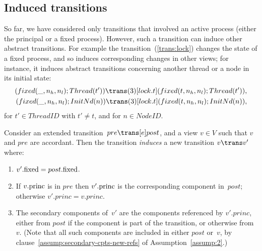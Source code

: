
\subsection{Induced transitions}

So far, we have considered only transitions that involved an active process
(either the principal or a fixed process). However, such a transition can
induce other abstract transitions.  For example the
transition~(\ref{trans:lock}) changes the state of a fixed process, and so
induces corresponding changes in other views; for instance, it induces abstract
transitions concerning another thread or a node in its initial state:
%
\[
\begin{align}
(fixed(\_, n_h, n_l); Thread(t'))  \trans(3)[lock.t] 
  (fixed(t, n_h, n_l); Thread(t')), \\
(fixed(\_, n_h, n_l); \InitNode(n))  \trans(3)[lock.t] 
  (fixed(t, n_h, n_l); \InitNode(n)),
\end{align}
\]
%
for $t' \in ThreadID$ with $t' \ne t$, and for $n \in NodeID$.

\begin{definition}
\label{def:induced-transition}
Consider an extended transition~$pre \trans[e] post$, and a view $v \in V$
such that $v$ and $pre$ are accordant.  Then the transition \emph{induces} a
new transition $v \trans v'$ where:
\begin{enumerate}
\item $v'.\mathrm{fixed} = post.\mathrm{fixed}$.

\item If $v.\mathrm{princ}$ is in $pre$ then $v'.\mathrm{princ}$ is the corresponding
  component in~$post$; otherwise $v'.princ = v.princ$.

\item The secondary components of~$v'$ are the components referenced by
  $v'.princ$, either from $post$ if the component is part of the transition,
  or otherwise from~$v$.  (Note that all such components are included in
  either $post$ or~$v$, by clause~\ref{assump:secondary-cpts-new-refs} of
  Assumption~\ref{assump:2}.)
\end{enumerate}
\end{definition}


